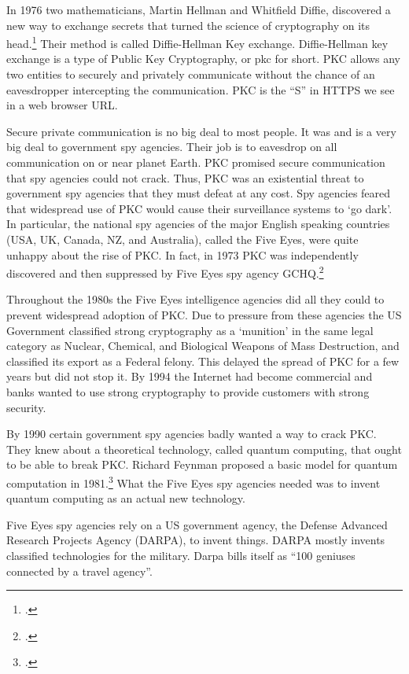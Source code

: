In 1976 two mathematicians, Martin Hellman and Whitfield Diffie, discovered a new way to exchange secrets that turned the science of cryptography on its head.\footcite{diffiehellman1976}  Their method is called Diffie-Hellman Key exchange.  Diffie-Hellman key exchange is a type of Public Key Cryptography, or \gls{pkc} for short.  PKC allows any two entities to securely and privately communicate without the chance of an eavesdropper intercepting the communication.  PKC is the ``S'' in HTTPS we see in a web browser URL.

Secure private communication is no big deal to most people.  It was and is a very big deal to government spy agencies.  Their job is to eavesdrop on all communication on or near planet Earth.  PKC promised secure communication that spy agencies could not crack.  Thus, PKC was an existential threat to government spy agencies that they must defeat at any cost.  Spy agencies feared that widespread use of PKC would cause their surveillance systems to `go dark'.  In particular, the national spy agencies of the major English speaking countries (USA, UK, Canada, NZ, and Australia), called the Five Eyes, were quite unhappy about the rise of PKC.  In fact, in 1973 PKC was independently discovered and then suppressed by Five Eyes spy agency GCHQ.\footcite{singh1999}

Throughout the 1980s the Five Eyes intelligence agencies did all they could to prevent widespread adoption of PKC.  Due to pressure from these agencies the US Government classified strong cryptography as a `munition' in the same legal category as Nuclear, Chemical, and Biological Weapons of Mass Destruction, and classified its export as a Federal felony.  This delayed the spread of PKC for a few years but did not stop it.  By 1994 the Internet had become commercial and banks wanted to use strong cryptography to provide customers with strong security.

By 1990 certain government spy agencies badly wanted a way to crack PKC.  They knew about a theoretical technology, called quantum computing, that ought to be able to break PKC.  Richard Feynman proposed a basic model for quantum computation in 1981.\footcite{feynman1982}  What the Five Eyes spy agencies needed was to invent quantum computing as an actual new technology.

Five Eyes spy agencies rely on a US government agency, the Defense Advanced Research Projects Agency (DARPA), to invent things.  DARPA mostly invents classified technologies for the military.  Darpa bills itself as ``100 geniuses connected by a travel agency''.

